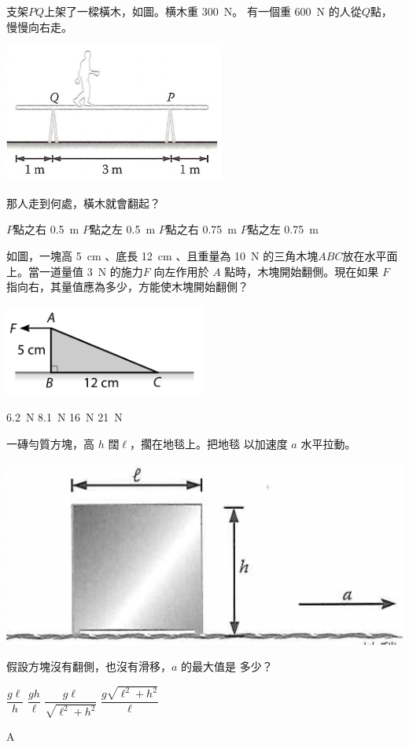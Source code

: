 
{
    支架$PQ$上架了一樑橫木，如圖。横木重 \qty{300}{N}。 有一個重 \qty{600}{N} 的人從$Q$點，慢慢向右走。\bigskip
    {\par\centering
        \includegraphics[width=.3\textwidth]{assets/efd30991.png}
        \par}\bigskip
    那人走到何處，橫木就會翻起？
    \begin{tasks}
        \task $P$點之右 \qty{0.5}{m}
        \task $P$點之左 \qty{0.5}{m}
        \task $P$點之右 \qty{0.75}{m}
        \task $P$點之左 \qty{0.75}{m}
    \end{tasks}
}{}

{
    如圖，一塊高 \qty{5}{cm} 、底長 \qty{12}{cm} 、且重量為 \qty{10}{N} 的三角木塊$ABC$放在水平面上。當一道量值 \qty{3}{N} 的施力$F$ 向左作用於 $A$ 點時，木塊開始翻側。現在如果 $F$ 指向右，其量值應為多少，方能使木塊開始翻側？\bigskip
    {\par\centering
        \includegraphics[width=.3\textwidth]{assets/ad661d08.png}
        \par}\bigskip
    \begin{tasks}
        \task \qty{6.2}{N}
        \task \qty{8.1}{N}
        \task \qty{16}{N}
        \task \qty{21}{N}

    \end{tasks}
}{}

{
    一磚勻質方塊，高 $h$ 闊$\ell$，擱在地毯上。把地毯 以加速度 $a$ 水平拉動。
    \bigskip
    {\par\centering
        \includegraphics[width=.3\textwidth]{assets/5b765e46.png}
        \par}\bigskip
    假設方塊沒有翻側，也沒有滑移，$a$ 的最大值是 多少？
    \begin{tasks}
        \task $\dfrac{g\ell}{h}$
        \task $\dfrac{gh}{\ell}$
        \task $\dfrac{g\ell}{\sqrt{\ell^2+h^2}}$
        \task $\dfrac{g\sqrt{\ell^2+h^2}}{\ell}$
    \end{tasks}
}{A}

